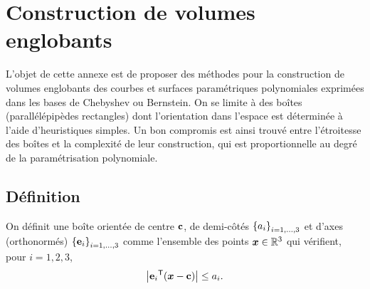 \chapter{Construction de volumes englobants}%
\label{app:obb}

L'objet de cette annexe est de proposer des méthodes pour la construction de volumes englobants des courbes et surfaces paramétriques polynomiales exprimées dans les bases de Chebyshev ou Bernstein.
On se limite à des boîtes (parallélépipèdes rectangles) dont l'orientation dans l'espace est déterminée à l'aide d'heuristiques simples. Un bon compromis est ainsi trouvé entre l'étroitesse des boîtes et la complexité de leur construction, qui est proportionnelle au degré de la paramétrisation polynomiale.


\section{Définition}
On définit une boîte orientée de centre $\mathbf{c}$, de demi-côtés $\left\{{a}_{i}\right\}_{{i}={1},\ldots,{3}}$ et d'axes (orthonormés) $\left\{{\mathbf{e}}_{i}\right\}_{{i}={1},\ldots,{3}}$ comme l'ensemble des points $\boldsymbol{x} \in \mathbb{R}^3$ qui vérifient, pour $i=1,2,3$,
\begin{equation}
	\left| {\mathbf{e}_i} ^\mathsf{T} {\left(\boldsymbol{x} - \mathbf{c}\right)} \right| \leq a_i.
	\label{eq:def_obb}
\end{equation}

